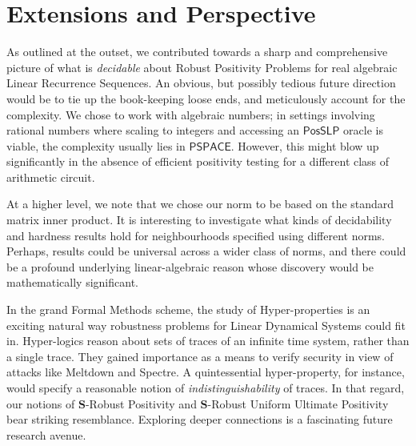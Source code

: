 \section{Extensions and Perspective}
As outlined at the outset, we contributed towards a sharp and comprehensive picture of what is \textit{decidable} about Robust Positivity Problems for real algebraic Linear Recurrence Sequences. An obvious, but possibly tedious future direction would be to tie up the book-keeping loose ends, and meticulously account for the complexity. We chose to work with algebraic numbers; in settings involving rational numbers where scaling to integers and accessing an $\mathsf{PosSLP}$ oracle is viable, the complexity usually lies in $\mathsf{PSPACE}$. However, this might blow up significantly in the absence of efficient positivity testing for a different class of arithmetic circuit.

At a higher level, we note that we chose our norm to be based on the standard matrix inner product. It is interesting to investigate what kinds of decidability and hardness results hold for neighbourhoods specified using different norms. Perhaps, results could be universal across a wider class of norms, and there could be a profound underlying linear-algebraic reason whose discovery would be mathematically significant.

In the grand Formal Methods scheme, the study of Hyper-properties \cite{hyperproperties} is an exciting natural way robustness problems for Linear Dynamical Systems could fit in. Hyper-logics reason about sets of traces of an infinite time system, rather than a single trace. They gained importance as a means to verify security in view of attacks like Meltdown and Spectre. A quintessential hyper-property, for instance, would specify a reasonable notion of \textit{indistinguishability} of traces. In that regard, our notions of $\mathbf{S}$-Robust Positivity and $\mathbf{S}$-Robust Uniform Ultimate Positivity bear striking resemblance. Exploring deeper connections is a fascinating future research avenue.
